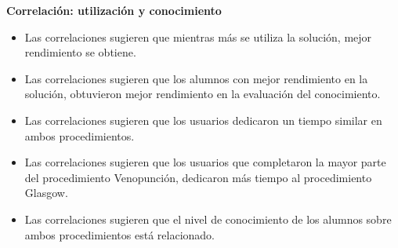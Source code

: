\documentclass[portrait,final,a0paper,fontscale=0.277]{baposter}
\begin{document}
\begin{poster}
{\begin{multicols}{2}
\textbf{Correlación: utilización y conocimiento}
	

	\scriptsize 
	
	\begin{itemize}
	
	\setlength\itemsep{0em}
    \item Las correlaciones sugieren que mientras más se utiliza la
        solución, mejor rendimiento se obtiene.
    \item Las correlaciones sugieren que los alumnos con mejor rendimiento
        en la solución, obtuvieron mejor rendimiento en la evaluación del
        conocimiento.
    \item Las correlaciones sugieren que los usuarios dedicaron un tiempo
        similar en ambos procedimientos.
    \item Las correlaciones sugieren que los usuarios que completaron la
        mayor parte del procedimiento Venopunción, dedicaron más tiempo al
        procedimiento Glasgow.
    \item Las correlaciones sugieren que el nivel de conocimiento de los
        alumnos sobre ambos procedimientos está relacionado.
	\end{itemize}
		

\end{multicols}
   \vspace{0.3em}
  }


\end{poster}
\end{document}
